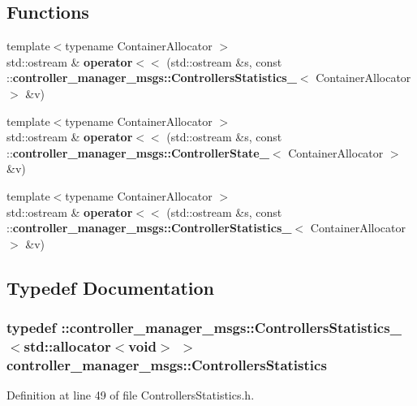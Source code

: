 \subsection*{\-Functions}
\begin{DoxyCompactItemize}
\item 
{\footnotesize template$<$typename Container\-Allocator $>$ }\\std\-::ostream \& {\bf operator$<$$<$} (std\-::ostream \&s, const \-::{\bf controller\-\_\-manager\-\_\-msgs\-::\-Controllers\-Statistics\-\_\-}$<$ \-Container\-Allocator $>$ \&v)
\item 
{\footnotesize template$<$typename Container\-Allocator $>$ }\\std\-::ostream \& {\bf operator$<$$<$} (std\-::ostream \&s, const \-::{\bf controller\-\_\-manager\-\_\-msgs\-::\-Controller\-State\-\_\-}$<$ \-Container\-Allocator $>$ \&v)
\item 
{\footnotesize template$<$typename Container\-Allocator $>$ }\\std\-::ostream \& {\bf operator$<$$<$} (std\-::ostream \&s, const \-::{\bf controller\-\_\-manager\-\_\-msgs\-::\-Controller\-Statistics\-\_\-}$<$ \-Container\-Allocator $>$ \&v)
\end{DoxyCompactItemize}


\subsection{\-Typedef \-Documentation}
\subsubsection[{\-Controllers\-Statistics}]{\setlength{\rightskip}{0pt plus 5cm}typedef \-::{\bf controller\-\_\-manager\-\_\-msgs\-::\-Controllers\-Statistics\-\_\-}$<$std\-::allocator$<$void$>$ $>$ {\bf controller\-\_\-manager\-\_\-msgs\-::\-Controllers\-Statistics}}\label{namespacecontroller__manager__msgs_a447a4ce89ee62322a3d76b95accc3b80}


\-Definition at line 49 of file \-Controllers\-Statistics.\-h.

